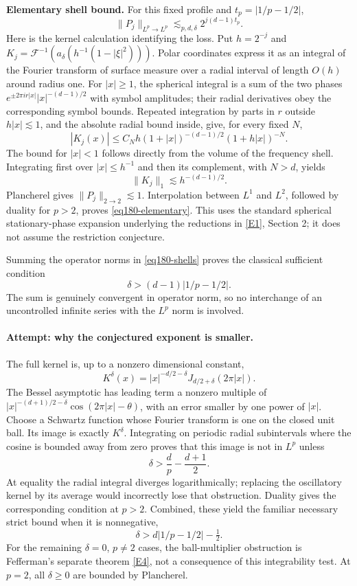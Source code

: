 \documentclass[11pt,a4paper]{article}
\newcommand{\eref}[2]{\hyperlink{extra:#1:#2}{[E#2]}}
\numberwithin{equation}{section}
\begin{document}
\textbf{Elementary shell bound.} For this fixed profile and
$t_p=|1/p-1/2|$,
\begin{equation}\label{eq180-elementary}
        \|P_j\|_{L^p\to L^p}\lesssim_{p,d,\delta}
                          2^{j(d-1)t_p}.
\end{equation}
Here is the kernel calculation identifying the loss. Put $h=2^{-j}$ and
$K_j=\mathcal F^{-1}(a_\delta(h^{-1}(1-|\xi|^2)))$. Polar coordinates
express it as an integral of the Fourier transform of surface measure
over a radial interval of length $O(h)$ around radius one. For $|x|\ge1$,
the spherical integral is a sum of the two phases
$e^{\pm2\pi i r|x|}|x|^{-(d-1)/2}$ with symbol amplitudes; their radial
derivatives obey the corresponding symbol bounds. Repeated integration
by parts in $r$ outside $h|x|\lesssim1$, and the absolute radial bound
inside, give, for every fixed $N$,
\[
 |K_j(x)|\le C_N h(1+|x|)^{-(d-1)/2}(1+h|x|)^{-N}.
\]
The bound for $|x|<1$ follows directly from the volume of the frequency
shell. Integrating first over $|x|\le h^{-1}$ and then its complement,
with $N>d$, yields
\[
        \|K_j\|_1\lesssim h^{-(d-1)/2}.
\]
Plancherel gives $\|P_j\|_{2\to2}\lesssim1$. Interpolation between
$L^1$ and $L^2$, followed by duality for $p>2$, proves
\eqref{eq180-elementary}. This uses the standard spherical
stationary-phase expansion underlying the reductions in
\eref{statement}{1}, Section 2; it does not assume the restriction conjecture.

Summing the operator norms in \eqref{eq180-shells} proves the classical
sufficient condition
\begin{equation}\label{eq180-classical}
                     \delta>(d-1)|1/p-1/2|.
\end{equation}
The sum is genuinely convergent in operator norm, so no interchange of an
uncontrolled infinite series with the $L^p$ norm is involved.

\paragraph{Attempt: why the conjectured exponent is smaller.}
The full kernel is, up to a nonzero dimensional constant,
\[
 K^\delta(x)=|x|^{-d/2-\delta}
                         J_{d/2+\delta}(2\pi|x|).
\]
The Bessel asymptotic has leading term a nonzero multiple of
$|x|^{-(d+1)/2-\delta}\cos(2\pi|x|-\theta)$, with an error smaller by
one power of $|x|$. Choose a Schwartz function whose Fourier transform is
one on the closed unit ball. Its image is exactly $K^\delta$. Integrating
on periodic radial subintervals where the cosine is bounded away from
zero proves that this image is not in $L^p$ unless
\[
             \delta>\frac d p-\frac{d+1}{2}.
\]
At equality the radial integral diverges logarithmically; replacing the
oscillatory kernel by its average would incorrectly lose that obstruction.
Duality gives the corresponding condition at $p>2$. Combined, these yield
the familiar necessary strict bound when it is nonnegative,
\[
                 \delta>d|1/p-1/2|-\tfrac12.
\]
For the remaining $\delta=0$, $p\ne2$ cases, the ball-multiplier obstruction
is Fefferman's separate theorem \eref{statement}{4}, not a consequence of this
integrability test. At $p=2$, all $\delta\ge0$ are bounded by Plancherel.
\end{document}
